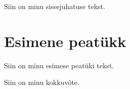 \documentclass{tlu-hk-thesis}
\begin{document}
\maketitlepage
\tableofcontents


Siin on minu sissejuhatuse tekst.

\section{Esimene peatükk}

Siin on minu esimese peatüki tekst.


Siin on minu kokkuvõte.


\end{document}
